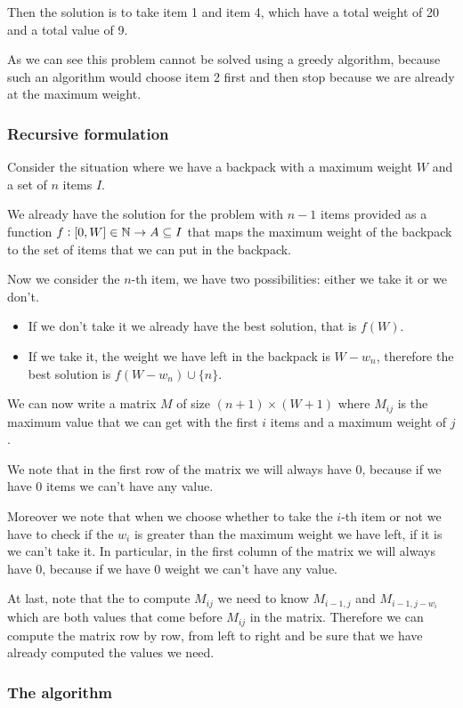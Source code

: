 \documentclass[12pt]{extarticle}
\begin{document}
Then the solution is to take item 1 and item 4, which have a total weight of 20 and a total value of 9.

As we can see this problem cannot be solved using a greedy algorithm, because such an algorithm would choose item 2 first and then stop because we are already at the maximum weight.

\subsubsection{Recursive formulation}

Consider the situation where we have a backpack with a maximum weight $W$ and a set of $n$ items $I$.

We already have the solution for the problem with $n-1$ items provided as a function $f : [0, W] \in \mathbb{N} \to A \subseteq I$ that maps the maximum weight of the backpack to the set of items that we can put in the backpack.

Now we consider the $n$-th item, we have two possibilities: either we take it or we don't.
\begin{itemize}
    \item If we don't take it we already have the best solution, that is $f(W)$.
    \item If we take it, the weight we have left in the backpack is $W - w_n$, therefore the best solution is $f(W - w_n) \cup \{n\}$.
\end{itemize}

We can now write a matrix $M$ of size $(n + 1) \times (W + 1)$ where $M_{ij}$ is the maximum value that we can get with the first $i$ items and a maximum weight of $j$.

We note that in the first row of the matrix we will always have 0, because if we have 0 items we can't have any value.

Moreover we note that when we choose whether to take the $i$-th item or not we have to check if the $w_i$ is greater than the maximum weight we have left, if it is we can't take it.
In particular, in the first column of the matrix we will always have 0, because if we have 0 weight we can't have any value.

At last, note that the to compute $M_{ij}$ we need to know $M_{i-1, j}$ and $M_{i-1, j - w_i}$ which are both values that come before $M_{ij}$ in the matrix.
Therefore we can compute the matrix row by row, from left to right and be sure that we have already computed the values we need.

\subsubsection{The algorithm}
\end{document}

